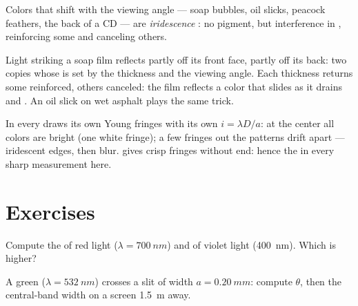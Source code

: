 \begin{definition}[Iridescence]\label{def:g12:light-as-wave:iridescence}
Colors that shift with the viewing angle --- soap bubbles, oil slicks,
peacock feathers, the back of a CD --- are \emph{iridescence}%
: no pigment, but interference in ,
reinforcing some  and canceling others.
\end{definition}

\begin{example}\label{ex:g12:light-as-wave:soap}
Light striking a soap film reflects partly off its front face, partly
off its back: two  copies whose  is set by the
thickness and the viewing angle. Each thickness returns some
 reinforced, others canceled: the film reflects a color
that slides as it drains and . An oil slick on wet asphalt plays
the same trick.
\end{example}

\begin{remark}\label{rem:g12:light-as-wave:white}
In  every  draws its own Young fringes with its
own $i = \lambda D/a$: at the center all colors are bright (one white
fringe); a few fringes out the patterns drift apart --- iridescent
edges, then blur.  gives crisp fringes without
end: hence the  in every sharp measurement here.
\end{remark}

\section{Exercises}

\begin{exercise}[$\star$]\label{exo:g12:light-as-wave:1}
Compute the  of red light ($\lambda = \qty{700}{nm}$) and of
violet light (\qty{400}{nm}). Which is higher?
\end{exercise}

\begin{exercise}[$\star$]\label{exo:g12:light-as-wave:2}
A green  ($\lambda = \qty{532}{nm}$) crosses a slit of width
$a = \qty{0.20}{mm}$: compute $\theta$, then the central-band width
on a screen \qty{1.5}{m} away.
\end{exercise}

